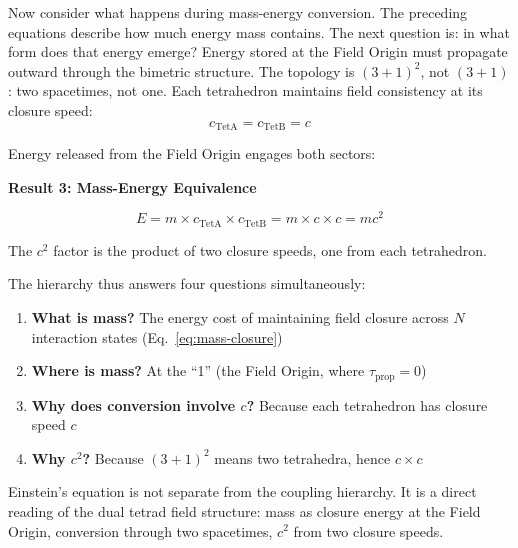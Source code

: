 \documentclass[aps,prd,preprint,superscriptaddress,showpacs,preprintnumbers,amsmath,amssymb,nofootinbib]{revtex4-2}
\begin{document}
Now consider what happens during mass-energy conversion. The preceding equations describe how much energy mass contains. The next question is: in what form does that energy emerge? Energy stored at the Field Origin must propagate outward through the bimetric structure. The topology is $(3{+}1)^2$, not $(3{+}1)$: two spacetimes, not one. Each tetrahedron maintains field consistency at its closure speed:
\begin{equation}
c_{\text{TetA}} = c_{\text{TetB}} = c
\end{equation}

Energy released from the Field Origin engages both sectors:

\vspace{1.5em}
\noindent
\colorbox{resultgreen}{\parbox{\dimexpr\textwidth-2\fboxsep\relax}{%
\vspace{0.8em}
\centering
\textbf{\large Result 3: Mass-Energy Equivalence}

\vspace{0.5em}
\boldmath
\begin{equation}
E = m \times c_{\text{TetA}} \times c_{\text{TetB}} = m \times c \times c = mc^2
\end{equation}
\unboldmath

\vspace{0.3em}
The $c^2$ factor is the product of two closure speeds, one from each tetrahedron.
\vspace{0.5em}
}}
\vspace{1cm}

The hierarchy thus answers four questions simultaneously:
\begin{enumerate}
\item \textbf{What is mass?} The energy cost of maintaining field closure across $N$ interaction states (Eq.~\ref{eq:mass-closure})
\item \textbf{Where is mass?} At the ``1'' (the Field Origin, where $\tau_{\text{prop}} = 0$)
\item \textbf{Why does conversion involve $c$?} Because each tetrahedron has closure speed $c$
\item \textbf{Why $c^2$?} Because $(3+1)^2$ means two tetrahedra, hence $c \times c$
\end{enumerate}

Einstein's equation is not separate from the coupling hierarchy. It is a direct reading of the dual tetrad field structure: mass as closure energy at the Field Origin, conversion through two spacetimes, $c^2$ from two closure speeds.
\end{document}
